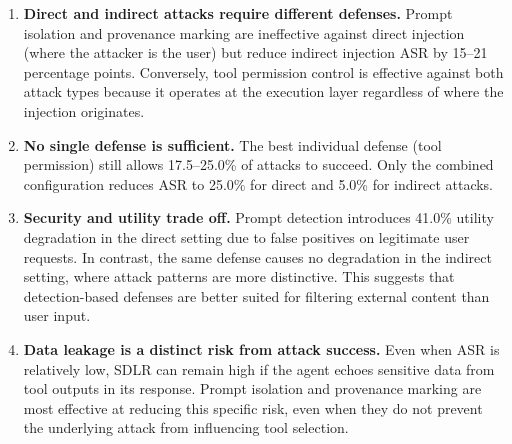 \begin{enumerate}
    \item \textbf{Direct and indirect attacks require different defenses.} Prompt isolation and provenance marking are ineffective against direct injection (where the attacker is the user) but reduce indirect injection ASR by 15--21 percentage points. Conversely, tool permission control is effective against both attack types because it operates at the execution layer regardless of where the injection originates.

    \item \textbf{No single defense is sufficient.} The best individual defense (tool permission) still allows 17.5--25.0\% of attacks to succeed. Only the combined configuration reduces ASR to 25.0\% for direct and 5.0\% for indirect attacks.

    \item \textbf{Security and utility trade off.} Prompt detection introduces 41.0\% utility degradation in the direct setting due to false positives on legitimate user requests. In contrast, the same defense causes no degradation in the indirect setting, where attack patterns are more distinctive. This suggests that detection-based defenses are better suited for filtering external content than user input.

    \item \textbf{Data leakage is a distinct risk from attack success.} Even when ASR is relatively low, SDLR can remain high if the agent echoes sensitive data from tool outputs in its response. Prompt isolation and provenance marking are most effective at reducing this specific risk, even when they do not prevent the underlying attack from influencing tool selection.
\end{enumerate}
